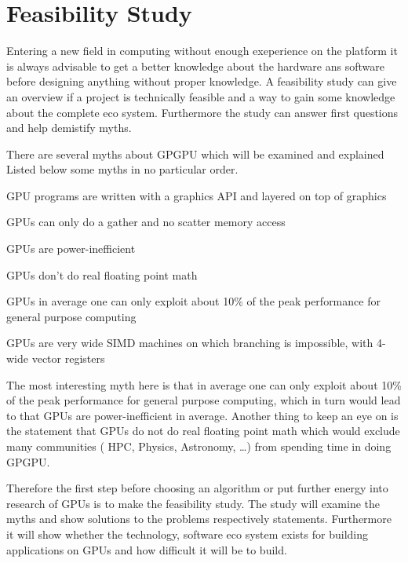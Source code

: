 
\chapter{Feasibility Study}
\label{chap:feas}
Entering a new field in computing without enough exeperience on the platform it 
is always advisable to get a better knowledge about the hardware ans software before
designing anything without proper knowledge. A feasibility study can give an overview
if a project is technically feasible and a way to gain some knowledge about the
complete eco system. Furthermore the study  can answer first questions and help
demistify myths. 

There are several myths about \gls{GPGPU} which will be examined and explained
Listed below some myths in no particular order.
\begin{enum}
	\item \Gls{GPU} programs are written with a graphics \gls{API} and layered on top 
		of graphics
	\label{enum:api}
	\item \Glspl{GPU} can only do a gather and no scatter memory access
	\label{enum:gather}
	\item \Glspl{GPU} are power-inefficient
	\label{enum:ineff}
	\item \Glspl{GPU} don't do real floating point math
	\label{enum:float}
	\item \Glspl{GPU} in average one can only exploit about 10\% of the peak 
		performance for general purpose computing
	\label{enum:exploit}
	\item \Glspl{GPU} are very wide \gls{SIMD} machines on which branching is 	  
		impossible, with 4-wide vector registers
 	\label{enum:simd}
\end{enum}

The most interesting myth here is that in average one can only exploit about
10\% of the peak performance for general purpose computing, which in turn would
lead to that \glspl{GPU} are power-inefficient in average. Another thing to keep
an eye on is the statement that \glspl{GPU} do not do real floating point math
which would exclude many communities ( \gls{HPC}, Physics, Astronomy, \ldots)
 from spending time in doing \gls{GPGPU}.

Therefore the first step before choosing an algorithm or put further energy into
research of \glspl{GPU} is to make the feasibility study. The study will examine
the myths and show solutions to the problems respectively statements.
Furthermore it will show whether the technology, software eco system exists for
building applications on \glspl{GPU} and how difficult it will be to build.


